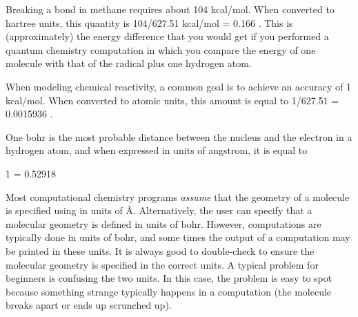 \documentclass[../Main/notes.tex]{subfiles}
\begin{document}
\begin{example}
Breaking a  bond in methane requires about 104 kcal/mol. When converted to hartree units, this quantity is 104/627.51 kcal/mol = 0.166 \Eh.
This is (approximately) the energy difference that you would get if you performed a quantum chemistry computation in which you compare the energy of one  molecule with that of the  radical plus one hydrogen atom.
\end{example}

\begin{example}
When modeling chemical reactivity, a common goal is to achieve an accuracy of 1 kcal/mol. When converted to atomic units, this amount is equal to 1/627.51 \Eh = 0.0015936 \Eh.
\end{example}

One bohr is the most probable distance between the nucleus and the electron in a hydrogen atom, and when expressed in units of angstrom, it is equal to
\begin{iequation}
1  = 0.52918 \text{ \AA{}}
\end{iequation}
Most computational chemistry programs \emph{assume} that the geometry of a molecule is specified using in units of \AA{}.
Alternatively, the user can specify that a molecular geometry is defined in units of bohr.
However, computations are typically done in units of bohr, and some times the output of a computation may be printed in these units.
It is always good to double-check to ensure the molecular geometry is specified in the correct units.
A typical problem for beginners is confusing the two units.
In this case, the problem is easy to spot because something strange typically happens in a computation (the molecule breaks apart or ends up scrunched up).
\end{document}

